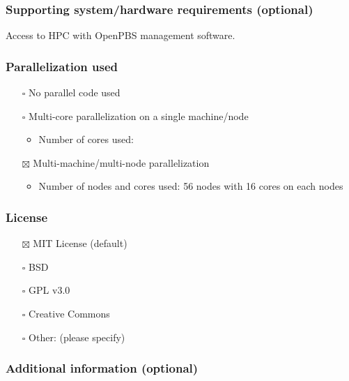 \documentclass[
]{article}
\providecommand{\tightlist}{%
  \setlength{\itemsep}{0pt}\setlength{\parskip}{0pt}}
\begin{document}
\subsubsection{Supporting system/hardware requirements
(optional)}\label{supporting-systemhardware-requirements-optional}

Access to HPC with OpenPBS management software.

\subsubsection{Parallelization used}\label{parallelization-used}

\begin{itemize}
\tightlist
\item[$\square$]
  No parallel code used
\item[$\square$]
  Multi-core parallelization on a single machine/node

  \begin{itemize}
  \tightlist
  \item
    Number of cores used:
  \end{itemize}
\item[$\boxtimes$]
  Multi-machine/multi-node parallelization

  \begin{itemize}
  \tightlist
  \item
    Number of nodes and cores used: 56 nodes with 16 cores on each nodes
  \end{itemize}
\end{itemize}

\subsubsection{License}\label{license}

\begin{itemize}
\tightlist
\item[$\boxtimes$]
  MIT License (default)
\item[$\square$]
  BSD
\item[$\square$]
  GPL v3.0
\item[$\square$]
  Creative Commons
\item[$\square$]
  Other: (please specify)
\end{itemize}

\subsubsection{Additional information
(optional)}\label{additional-information-optional-1}
\end{document}
